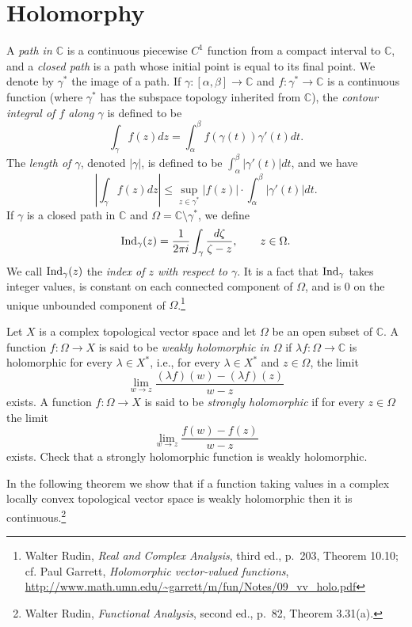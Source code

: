 \documentclass{article}
\newcommand{\Ind}{\ensuremath\mathrm{Ind}}
\theoremstyle{definition}
\begin{document}
\section{Holomorphy}
A {\em path in $\mathbb{C}$} is a continuous piecewise $C^1$ function from a compact interval to $\mathbb{C}$, and a {\em closed path} is a path whose
initial point is equal to its final point. We denote by $\gamma^*$ the image of a path. 
If $\gamma:[\alpha,\beta] \to \mathbb{C}$ and
 $f:\gamma^* \to \mathbb{C}$ is a continuous function  (where $\gamma^*$ has the subspace
 topology inherited from $\mathbb{C}$), the {\em contour integral of $f$ along $\gamma$} 
is defined to be 
\[
\int_\gamma f(z) dz = \int_\alpha^\beta f(\gamma(t)) \gamma'(t) dt.
\]
The {\em length of $\gamma$}, denoted $|\gamma|$, is defined to be $\int_\alpha^\beta |\gamma'(t)| dt$, and we have
\[
\left| \int_\gamma f(z) dz \right| \leq \sup_{z \in \gamma^*} |f(z)| \cdot \int_{\alpha}^\beta |\gamma'(t)| dt.
\]
If $\gamma$ is a closed path in $\mathbb{C}$ and $\Omega=\mathbb{C} \setminus \gamma^*$, we define
\[
\Ind_\gamma(z)=\frac{1}{2\pi i} \int_\gamma \frac{d\zeta}{\zeta-z}, \qquad z\in \Omega.
\]
We call $\Ind_\gamma(z)$ the {\em index of $z$ with respect to $\gamma$}. It is a fact that
$\Ind_\gamma$ takes integer values, is constant on each connected component of $\Omega$, and
is $0$ on the unique unbounded component of $\Omega$.\footnote{Walter Rudin, {\em Real and Complex Analysis},
third ed., p.~203, Theorem 10.10; cf. Paul Garrett, {\em Holomorphic vector-valued functions}, \url{http://www.math.umn.edu/~garrett/m/fun/Notes/09_vv_holo.pdf}}

Let $X$ is a complex topological vector space and let $\Omega$ be an open subset of $\mathbb{C}$. A function
$f:\Omega \to X$ is said to be {\em weakly holomorphic in $\Omega$} if $\lambda f:\Omega \to \mathbb{C}$ is holomorphic
for every $\lambda \in X^*$, i.e., for every $\lambda \in X^*$ and $z \in \Omega$, the limit
\[
\lim_{w \to z} \frac{(\lambda f)(w)-(\lambda f)(z)}{w-z}
\]
exists.
A function $f:\Omega \to X$ is said to be {\em strongly holomorphic} if for every $z \in \Omega$ the limit
\[
\lim_{w \to z} \frac{f(w)-f(z)}{w-z}
\]
exists. Check that a strongly holomorphic function is weakly holomorphic.


 In the following theorem we show that if a function taking
values in a complex locally convex topological vector space
is weakly holomorphic then it is continuous.\footnote{Walter Rudin, {\em Functional Analysis},
second ed., p.~82, Theorem 3.31(a).}
\end{document}
